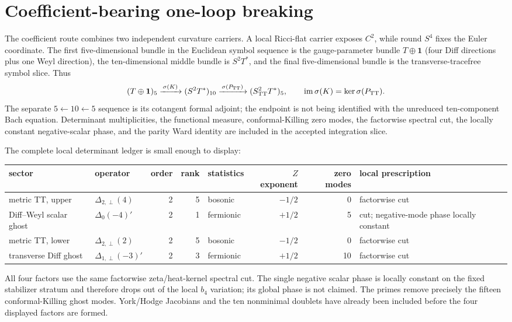 \documentclass[11pt]{article}
\theoremstyle{definition}
\theoremstyle{remark}
\begin{document}
\section{Coefficient-bearing one-loop breaking}

The coefficient route combines two independent curvature carriers.  A local
Ricci-flat carrier exposes $C^2$, while round $S^4$ fixes the Euler coordinate.
The first five-dimensional bundle in the Euclidean symbol sequence is the
gauge-parameter bundle $T\oplus\mathbf 1$ (four Diff directions plus one Weyl
direction), the ten-dimensional middle bundle is $S^2T^*$, and the final
five-dimensional bundle is the transverse-tracefree symbol slice.  Thus
\[
 (T\oplus\mathbf1)_{5}\xrightarrow{\,\sigma(K)\,}
 (S^2T^*)_{10}\xrightarrow{\,\sigma(P_{\rm TT})\,}
 (S^2_{\rm TT}T^*)_{5},
 \qquad \operatorname{im}\sigma(K)=\ker\sigma(P_{\rm TT}).
\]
The separate $5\leftarrow10\leftarrow5$ sequence is its cotangent formal
adjoint; the endpoint is not being identified with the unreduced ten-component
Bach equation.  Determinant multiplicities, the functional
measure, conformal-Killing zero modes, the factorwise spectral cut, the
locally constant negative-scalar phase, and the parity Ward identity are
included in the accepted integration slice.

The complete local determinant ledger is small enough to display:
\begin{center}
\small
\begin{tabularx}{\textwidth}{@{}YlrrlrrY@{}}
\toprule
sector & operator & order & rank & statistics & $Z$ exponent & zero modes & local prescription\\
\midrule
metric TT, upper & $\Delta_{2,\perp}(4)$ & 2 & 5 & bosonic & $-1/2$ & 0 & factorwise cut\\
Diff--Weyl scalar ghost & $\Delta_0(-4)'$ & 2 & 1 & fermionic & $+1/2$ & 5 & cut; negative-mode phase locally constant\\
metric TT, lower & $\Delta_{2,\perp}(2)$ & 2 & 5 & bosonic & $-1/2$ & 0 & factorwise cut\\
transverse Diff ghost & $\Delta_{1,\perp}(-3)'$ & 2 & 3 & fermionic & $+1/2$ & 10 & factorwise cut\\
\bottomrule
\end{tabularx}
\end{center}
All four factors use the same factorwise zeta/heat-kernel spectral cut.  The
single negative scalar phase is locally constant on the fixed stabilizer
stratum and therefore drops out of the local $b_4$ variation; its global phase
is not claimed.  The primes remove precisely the fifteen conformal-Killing
ghost modes.  York/Hodge Jacobians and the ten nonminimal doublets have already
been included before the four displayed factors are formed.
\end{document}
